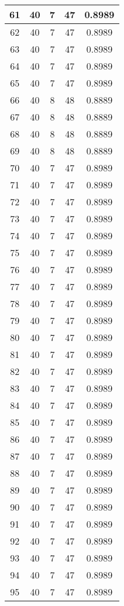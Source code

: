 \documentclass[letterpaper, 12pt]{article}
\begin{document}
\begin{longtable}{|c|c|c|c|c|}
61 & 40 & 7 & 47 & 0.8989 \\
\hline
62 & 40 & 7 & 47 & 0.8989 \\
\hline
63 & 40 & 7 & 47 & 0.8989 \\
\hline
64 & 40 & 7 & 47 & 0.8989 \\
\hline
65 & 40 & 7 & 47 & 0.8989 \\
\hline
66 & 40 & 8 & 48 & 0.8889 \\
\hline
67 & 40 & 8 & 48 & 0.8889 \\
\hline
68 & 40 & 8 & 48 & 0.8889 \\
\hline
69 & 40 & 8 & 48 & 0.8889 \\
\hline
70 & 40 & 7 & 47 & 0.8989 \\
\hline
71 & 40 & 7 & 47 & 0.8989 \\
\hline
72 & 40 & 7 & 47 & 0.8989 \\
\hline
73 & 40 & 7 & 47 & 0.8989 \\
\hline
74 & 40 & 7 & 47 & 0.8989 \\
\hline
75 & 40 & 7 & 47 & 0.8989 \\
\hline
76 & 40 & 7 & 47 & 0.8989 \\
\hline
77 & 40 & 7 & 47 & 0.8989 \\
\hline
78 & 40 & 7 & 47 & 0.8989 \\
\hline
79 & 40 & 7 & 47 & 0.8989 \\
\hline
80 & 40 & 7 & 47 & 0.8989 \\
\hline
81 & 40 & 7 & 47 & 0.8989 \\
\hline
82 & 40 & 7 & 47 & 0.8989 \\
\hline
83 & 40 & 7 & 47 & 0.8989 \\
\hline
84 & 40 & 7 & 47 & 0.8989 \\
\hline
85 & 40 & 7 & 47 & 0.8989 \\
\hline
86 & 40 & 7 & 47 & 0.8989 \\
\hline
87 & 40 & 7 & 47 & 0.8989 \\
\hline
88 & 40 & 7 & 47 & 0.8989 \\
\hline
89 & 40 & 7 & 47 & 0.8989 \\
\hline
90 & 40 & 7 & 47 & 0.8989 \\
\hline
91 & 40 & 7 & 47 & 0.8989 \\
\hline
92 & 40 & 7 & 47 & 0.8989 \\
\hline
93 & 40 & 7 & 47 & 0.8989 \\
\hline
94 & 40 & 7 & 47 & 0.8989 \\
\hline
95 & 40 & 7 & 47 & 0.8989 \\

\end{longtable}
\end{document}
